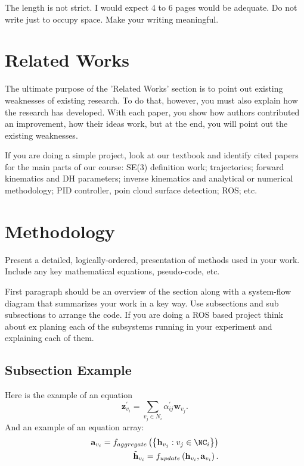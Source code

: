 \documentclass[conference]{IEEEtran}
\begin{document}
The length is not strict. I would expect 4 to 6 pages would be adequate. Do not write just to occupy space. Make your writing meaningful.
\section{Related Works}
The ultimate purpose of the 'Related Works' section is to point out existing weaknesses of existing research. To do that, however,  you must also explain how the research has developed. With each paper, you show how authors contributed an improvement, how their ideas work, but at the end, you will point out the existing weaknesses. 

If you are doing a simple project, look at our textbook and identify cited papers for the main parts of our course: SE(3) definition work; trajectories; forward kinematics and DH parameters; inverse kinematics and analytical or numerical methodology; PID controller, poin cloud surface detection; ROS; etc. 
\section{Methodology}
Present a detailed, logically-ordered, presentation of methods used in your work. Include any key mathematical equations, pseudo-code, etc. 

First paragraph should be an overview of the section along with a system-flow diagram that summarizes your work in a key way. Use subsections and sub subsections to arrange the code. If you are doing a ROS based project think about ex planing each of the subsystems running in your experiment and explaining each of them. 
\subsection{Subsection Example}
Here is the example of an equation
\begin{equation}
   \mathbf{z}_{v_i}^{'} = \sum_{v_j \in N_i} \alpha_{ij}^\prime \mathbf{w}_{v_j}. 
\end{equation}
And an example of an equation array:
\begin{eqnarray}
   \mathbf{a}_{v_i}=f_{aggregate}  
   \left(  
      \left\{ 
         \mathbf{h}_{v_j} : v_j \in \NC_i  
      \right\}
   \right) \\
    \tilde{\mathbf{h}}_{v_i} = f_{update}
    \left( 
      \mathbf{h}_{v_i},\mathbf{a}_{v_i}
    \right).
\end{eqnarray}
\end{document}
